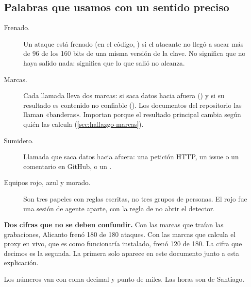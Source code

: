 \subsection*{Palabras que usamos con un sentido preciso}

\begin{description}
  \item[Frenado.] Un ataque está frenado (en el código, ) si el atacante no llegó a
    sacar más de 96 de los 160 bits de una misma versión de la clave. No significa que no haya salido
    nada: significa que lo que salió no alcanza.
  \item[Marcas.] Cada llamada lleva dos marcas: si saca datos hacia afuera () y si su
    resultado es contenido no confiable (). Los documentos del repositorio las llaman
    «banderas». Importan porque el resultado principal cambia según quién las calcula
    (\cref{sec:hallazgo-marcas}).
  \item[Sumidero.] Llamada que saca datos hacia afuera: una petición HTTP, un issue o un comentario
    en GitHub, o un .
  \item[Equipos rojo, azul y morado.] Son tres papeles con reglas escritas, no tres grupos de
    personas. El rojo fue una sesión de agente aparte, con la regla de no abrir el detector.
\end{description}

\begin{limite}
\textbf{Dos cifras que no se deben confundir.} Con las marcas que traían las grabaciones, Alicanto
frenó 180 de 180 ataques. Con las marcas que calcula el proxy en vivo, que es como funcionaría
instalado, frenó 120 de 180. La cifra que decimos es la segunda. La primera solo aparece en este
documento junto a esta explicación.
\end{limite}

Los números van con coma decimal y punto de miles. Las horas son de Santiago.
\clearpage
